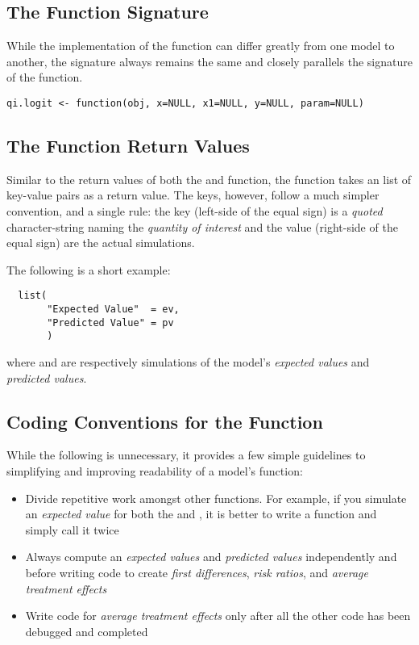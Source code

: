 \subsection{The  Function Signature}

While the implementation of the  function can differ greatly from one
model to another, the signature always remains the same and closely parallels the 
signature of the  function.


\begin{verbatim}
qi.logit <- function(obj, x=NULL, x1=NULL, y=NULL, param=NULL)
\end{verbatim}



\subsection{The  Function Return Values}

Similar to the return values of both the  and  function,
the  function takes an list of key-value pairs as a return value. The keys,
however, follow a much simpler convention, and a single rule: the key (left-side
of the equal sign) is a \emph{quoted} character-string naming the \emph{quantity of
interest} and the value (right-side of the equal sign) are the actual simulations.

The following is a short example:

\begin{verbatim}
  list(
       "Expected Value"  = ev,
       "Predicted Value" = pv
       )
\end{verbatim}

\noindent where  and  are respectively simulations of the model's
\emph{expected values} and \emph{predicted values}.

\subsection{Coding Conventions for the  Function}

While the following is unnecessary, it provides a few simple guidelines to simplifying
and improving readability of a model's  function:

\begin{itemize}

	\item Divide repetitive work amongst other functions. For example, if you simulate
		an \emph{expected value} for both the  and , it is better to 
		write a  function and simply call it twice
		
	\item Always compute an \emph{expected values} and \emph{predicted values} independently
		and before writing code to create \emph{first differences}, \emph{risk ratios}, and
		\emph{average treatment effects}
		
	\item Write code for \emph{average treatment effects} only after all the other code has
		been debugged and completed

\end{itemize}


